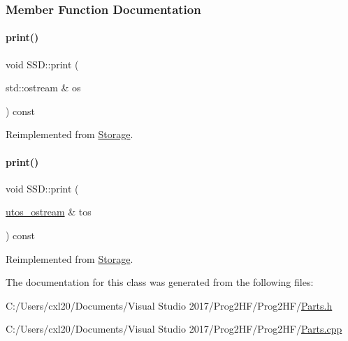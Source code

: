 \subsubsection{Member Function Documentation}
\mbox{\label{class_s_s_d_a3c07aa0fd7bb547cfb4a775513e427a9}} 
\paragraph{\texorpdfstring{print()}{print()}\hspace{0.1cm}{\footnotesize\ttfamily [1/2]}}
{\footnotesize\ttfamily void S\+S\+D\+::print (\begin{DoxyParamCaption}\item[{std\+::ostream \&}]{os }\end{DoxyParamCaption}) const\hspace{0.3cm}{\ttfamily [virtual]}}



Reimplemented from \mbox{\hyperlink{class_storage_aa9f6ffb0fd45839b54bd4e254270445d}{Storage}}.

\mbox{\label{class_s_s_d_ab07086e302f8be99cfa757583d2017a0}} 
\paragraph{\texorpdfstring{print()}{print()}\hspace{0.1cm}{\footnotesize\ttfamily [2/2]}}
{\footnotesize\ttfamily void S\+S\+D\+::print (\begin{DoxyParamCaption}\item[{\mbox{\hyperlink{structutos__ostream}{utos\+\_\+ostream}} \&}]{tos }\end{DoxyParamCaption}) const\hspace{0.3cm}{\ttfamily [virtual]}}



Reimplemented from \mbox{\hyperlink{class_storage_ab7ecf9e0777891b4e1a84bbf391a1cd4}{Storage}}.



The documentation for this class was generated from the following files\+:\begin{DoxyCompactItemize}
\item 
C\+:/\+Users/cxl20/\+Documents/\+Visual Studio 2017/\+Prog2\+H\+F/\+Prog2\+H\+F/\mbox{\hyperlink{_parts_8h}{Parts.\+h}}\item 
C\+:/\+Users/cxl20/\+Documents/\+Visual Studio 2017/\+Prog2\+H\+F/\+Prog2\+H\+F/\mbox{\hyperlink{_parts_8cpp}{Parts.\+cpp}}\end{DoxyCompactItemize}
